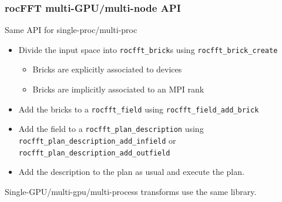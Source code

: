 \documentclass[10pt,aspectratio=169]{beamer}
\begin{document}
\begin{frame}
  \frametitle{rocFFT multi-GPU/multi-node API}

  \begin{center}
    Same API for single-proc/multi-proc
  \end{center}

  \bigskip
  
  \begin{itemize}
  \item Divide the input space into \lstinline{rocfft_brick}s using
    \lstinline{rocfft_brick_create}
    \begin{itemize}
    \item Bricks are explicitly associated to devices
    \item Bricks are implicitly associated to an MPI rank
    \end{itemize}
  \item Add the bricks to a \lstinline{rocfft_field} using
    \lstinline{rocfft_field_add_brick}
  \item Add the field to a \lstinline{rocfft_plan_description} using
    \lstinline{rocfft_plan_description_add_infield} or
    \lstinline{rocfft_plan_description_add_outfield}
  \item Add the description to the plan as usual and execute the plan.
  \end{itemize}
  
  \bigskip

  \begin{center}
    Single-GPU/multi-gpu/multi-process transforms use the same library.
  \end{center}
  
\end{frame}
  
\end{document}

